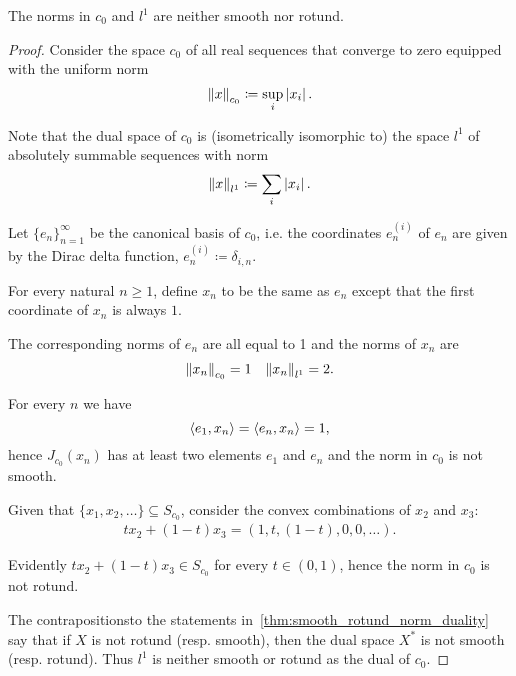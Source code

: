 \begin{example}\label{thm:c0_l1_not_smooth_rotund}\cite[exercise 2.37(c)]{Phelps1993}
  The norms in \( c_0 \) and \( l^1 \) are neither smooth nor rotund.
\end{example}
\begin{proof}
  Consider the space \( c_0 \) of all real sequences that converge to zero equipped with the uniform norm
  \begin{equation*}
    \left\Vert x \right\Vert_{c_0} \coloneqq \sup_i \left\vert x_i \right\vert.
  \end{equation*}

  Note that the dual space of \( c_0 \) is (isometrically isomorphic to) the space \( l^1 \) of absolutely summable sequences with norm
  \begin{equation*}
    \left\Vert x \right\Vert_{l^1} \coloneqq \sum_i \left\vert x_i \right\vert.
  \end{equation*}

  Let \( \{ e_n \}_{n=1}^\infty \) be the canonical basis of \( c_0 \), i.e. the coordinates \( e^{(i)}_n \) of \( e_n \) are given by the Dirac delta function, \( e^{(i)}_n \coloneqq \delta_{i,n} \).

  For every natural \( n \geq 1 \), define \( x_n \) to be the same as \( e_n \) except that the first coordinate of \( x_n \) is always \( 1 \).

  The corresponding norms of \( e_n \) are all equal to 1 and the norms of \( x_n \) are
  \begin{align*}
    \left\Vert x_n \right\Vert_{c_0} = 1
    &&
    \left\Vert x_n \right\Vert_{l^1} = 2.
  \end{align*}

  For every \( n \) we have
  \begin{equation*}
    \left\langle e_1, x_n \right\rangle = \left\langle e_n, x_n \right\rangle = 1,
  \end{equation*}
  hence \( J_{c_0}(x_n) \) has at least two elements \( e_1 \) and \( e_n \) and the norm in \( c_0 \) is not smooth.

  Given that \( \{ x_1, x_2, \ldots \} \subseteq S_{c_0} \), consider the convex combinations of \( x_2 \) and \( x_3 \):
  \begin{align*}
    tx_2 + (1-t)x_3
    =
    (1, t, (1-t), 0, 0, \ldots).
  \end{align*}

  Evidently \( tx_2 + (1-t)x_3 \in S_{c_0} \) for every \( t \in (0, 1) \), hence the norm in \( c_0 \) is not rotund.

  The contrapositions\LEM to the statements in~\cref{thm:smooth_rotund_norm_duality} say that if \( X \) is not rotund (resp. smooth), then the dual space \( X^* \) is not smooth (resp. rotund). Thus \( l^1 \) is neither smooth or rotund as the dual of \( c_0 \).
\end{proof}
